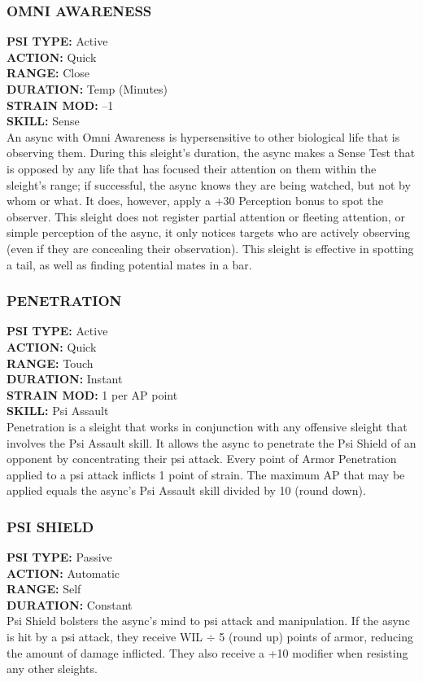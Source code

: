 \subsubsection{OMNI AWARENESS}
\textbf{PSI TYPE:} Active \\ 
\textbf{ACTION:} Quick \\ 
\textbf{RANGE:} Close \\ 
\textbf{DURATION:} Temp (Minutes) \\
\textbf{STRAIN MOD:} –1 \\ 
\textbf{SKILL:} Sense\\
An async with Omni Awareness is hypersensitive to
other biological life that is observing them. During
this sleight’s duration, the async makes a Sense Test
that is opposed by any life that has focused their attention
on them within the sleight’s range; if successful,
the async knows they are being watched, but not
by whom or what. It does, however, apply a +30 Perception
bonus to spot the observer. This sleight does
not register partial attention or fleeting attention, or
simple perception of the async, it only notices targets
who are actively observing (even if they are concealing
their observation). This sleight is effective in spotting a
tail, as well as finding potential mates in a bar.

\subsubsection{PENETRATION}
\textbf{PSI TYPE:} Active \\ 
\textbf{ACTION:} Quick \\ 
\textbf{RANGE:} Touch \\ 
\textbf{DURATION:} Instant \\
\textbf{STRAIN MOD:} 1 per AP point \\ 
\textbf{SKILL:} Psi Assault \\
Penetration is a sleight that works in conjunction with
any offensive sleight that involves the Psi Assault skill.
It allows the async to penetrate the Psi Shield of an opponent
by concentrating their psi attack. Every point
of Armor Penetration applied to a psi attack inflicts
1 point of strain. The maximum AP that may be applied
equals the async’s Psi Assault skill divided by 10
(round down).

\subsubsection{PSI SHIELD}
\textbf{PSI TYPE:} Passive \\ 
\textbf{ACTION:} Automatic \\ 
\textbf{RANGE:} Self \\ 
\textbf{DURATION:} Constant \\
Psi Shield bolsters the async’s mind to psi attack and
manipulation. If the async is hit by a psi attack, they
receive WIL $\div$ 5 (round up) points of armor, reducing
the amount of damage inflicted. They also receive a
+10 modifier when resisting any other sleights.

